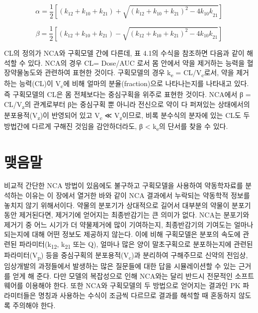 \documentclass[
  11pt,
  krantz2, a4paper, twoside]{krantz}
\theoremstyle{definition}
\theoremstyle{definition}
\theoremstyle{definition}
\theoremstyle{definition}
\theoremstyle{remark}
\begin{document}
\begin{equation}
\alpha = \frac{1}{2}\left\lbrack \left( k_{12} + k_{10} + k_{21} \right) + \sqrt{\left( k_{12} + k_{10} + k_{21} \right)^{2} - 4{k_{10}k}_{21}} \right\rbrack
\label{eq:eq4-6}
\end{equation}

\begin{equation}
\beta = \frac{1}{2}\left\lbrack \left( k_{12} + k_{10} + k_{21} \right) - \sqrt{\left( k_{12} + k_{10} + k_{21} \right)^{2} - 4{k_{10}k}_{21}} \right\rbrack
\label{eq:eq4-7}
\end{equation}

CL의 정의가 NCA와 구획모델 간에 다른데, 표 4.1의 수식을 참조하면 다음과
같이 해석할 수 있다. NCA의 경우 CL= Dose/AUC 로서 몸 안에서 약을
제거하는 능력을 혈장약물농도와 관련하여 표현한 것이다. 구획모델의 경우
k\textsubscript{e} = CL/V\textsubscript{c}로서, 약을 제거하는 능력(CL)이 V\textsubscript{c}에 비해 얼마의
분율(fraction)으로 나타나는지를 나타내고 있다. 즉 구획모델의 CL은 몸
전체보다는 중심구획을 위주로 표현한 것이다. NCA에서 β = CL/V\textsubscript{z}의
관계로부터 β는 중심구획 뿐 아니라 전신으로 약이 다 퍼져있는 상태에서의
분포용적(V\textsubscript{z})이 반영되어 있고 V\textsubscript{c} ≪ V\textsubscript{z}이므로, 비록 분수식의 분자에
있는 CL도 두 방법간에 다르게 구해진 것임을 감안하더라도, β \textless{} k\textsubscript{e}의 단서를 찾을 수 있다.

\hypertarget{uxb9fauxc74cuxb9d0-3}{%
\section{맺음말}\label{uxb9fauxc74cuxb9d0-3}}

비교적 간단한 NCA 방법이 있음에도 불구하고 구획모델을 사용하여
약동학자료를 분석하는 이유는 이 장에서 열거한 바와 같이 NCA 결과에서 누락되는 약동학적 정보를 놓치지 않기 위해서이다.
약물의 분포기가 상대적으로 길어서 대부분의 약물이 분포기동안 제거된다면, 제거기에 얻어지는 최종반감기는 큰 의미가 없다. 
NCA는 분포기와 제거기 중 어느 시기가 더 약물제거에 많이 기여하는지, 최종반감기의 기여도는 얼마나 되는지에 대해
어떤 정보도 제공하지 않는다.
이에 비해 구획모델은 분포의 속도에 관련된 파라미터(k\textsubscript{12}, k\textsubscript{21} 또는 Q), 얼마나 많은 양이 말초구획으로
분포하는지에 관련된 파라미터(V\textsubscript{p}) 등을 중심구획의 분포용적(V\textsubscript{c})과 분리하여
구해주므로 신약의 전임상, 임상개발의 과정들에서 발생하는 많은 질문들에
대한 답을 시뮬레이션할 수 있는 근거를 얻게 해 준다. 다만 모델의
복잡성으로 인해 NCA와는 달리 반드시 전문적인 소프트웨어를 이용해야 한다.
또한 NCA와 구획모델의 두 방법으로 얻어지는 결과인 PK 파라미터들은 명칭과 사용하는 수식이 조금씩 다르므로 결과를 해석할 때 혼동하지 않도록 주의해야 한다.
\end{document}
